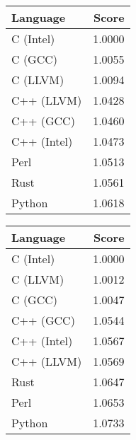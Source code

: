 \begin{subtable}{0.33\textwidth}
    \centering
    \caption{$k=3$}
    \label{table:energy:regexp(3)}
    \begin{tabular}{|l|r|}
        \hline
        Language & Score \\
        \hline
        C (Intel) & 1.0000 \\
        C (GCC) & 1.0055 \\
        C (LLVM) & 1.0094 \\
        C++ (LLVM) & 1.0428 \\
        C++ (GCC) & 1.0460 \\
        C++ (Intel) & 1.0473 \\
        Perl & 1.0513 \\
        Rust & 1.0561 \\
        Python & 1.0618 \\
        \hline
    \end{tabular}
\end{subtable}
\begin{subtable}{0.33\textwidth}
    \centering
    \caption{$k=4$}
    \label{table:energy:regexp(4)}
    \begin{tabular}{|l|r|}
        \hline
        Language & Score \\
        \hline
        C (Intel) & 1.0000 \\
        C (LLVM) & 1.0012 \\
        C (GCC) & 1.0047 \\
        C++ (GCC) & 1.0544 \\
        C++ (Intel) & 1.0567 \\
        C++ (LLVM) & 1.0569 \\
        Rust & 1.0647 \\
        Perl & 1.0653 \\
        Python & 1.0733 \\
        \hline
    \end{tabular}
\end{subtable}%
